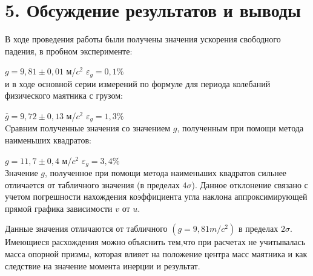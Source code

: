 \section*{5. Обсуждение результатов и выводы}

    В ходе проведения работы были получены значения ускорения свободного падения, в пробном эксперименте:
    
    $g = 9,81 \pm 0,01$ м/$c^2$ $\varepsilon_g = 0,1\%$\\
    
    и в ходе основной серии измерений по формуле для периода колебаний физического маятника с грузом:
    
    $\overline{g} = 9,72 \pm 0,13$ м/$c^2$ $\varepsilon_g = 1,3\%$\\
    
    
    Cравним полученные значения со значением $g$, полученным при помощи метода наименьших квадратов: 
    
    $g = 11,7 \pm 0,4 $ м/$c^2$ $\varepsilon_g = 3,4\%$\\
    
    Значение $g$, полученное при помощи метода наименьших квадратов сильнее отличается от табличного значения (в пределах $4\sigma$). Данное отклонение связано с учетом погрешности нахождения коэффициента угла наклона аппроксимирующей прямой графика зависимости $v$ от $u$.

    Данные значения отличаются от табличного $(g = 9,81 m/c^2)$ в пределах $2\sigma$. Имеющиеся расхождения можно объяснить тем,что при расчетах не учитывалась масса опорной призмы, которая влияет на положение центра масс маятника и как следствие на значение момента инерции и результат.





